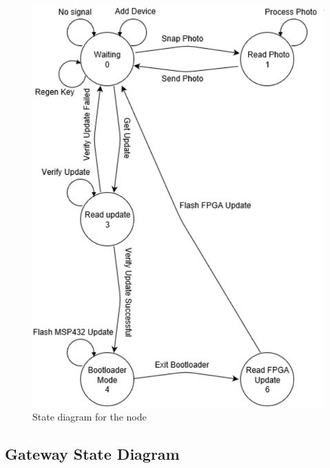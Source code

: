 \documentclass[11pt]{article}
\begin{document}
\begin{figure}[!ht]
\centering
\includegraphics[scale = 0.35]{nodestate.png}
\caption{State diagram for the node}
\end{figure}
\FloatBarrier
\subsection{Gateway State Diagram}
\end{document}
